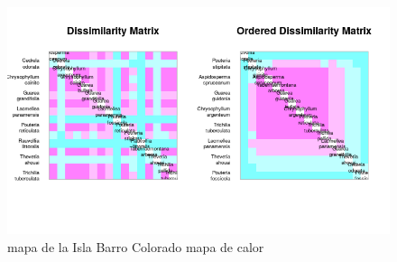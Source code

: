 \documentclass[11pt,]{article}
\begin{document}
\begin{figure}
\centering
\includegraphics[width=1.00000\textwidth]{mapadecalor.png}
\caption{mapa de la Isla Barro Colorado mapa de calor
\label{fig:bci_map}}
\end{figure}
\end{document}
